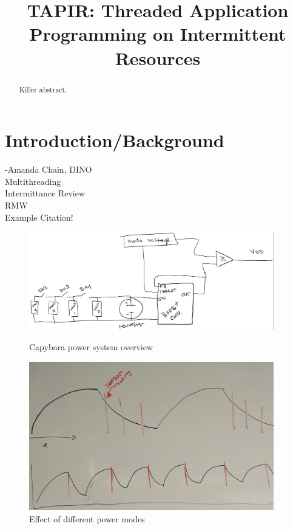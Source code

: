 \documentclass[11pt]{sensys-proc}
\title{TAPIR: Threaded Application Programming on Intermittent Resources}
\begin{document}
\maketitle

\begin{abstract}
Killer abstract.
\end{abstract}

\section{Introduction/Background} -Amanda
  \label{sec:intro}
  Chain, DINO\\
  Multithreading\\
  Intermittance Review\\
  RMW\\
  Example Citation\cite{Chain, Mementos, Aware, Dino}!


\begin{figure}
\centering
\begin{minipage}[b]{0.49\textwidth}
  \includegraphics[width=0.95\textwidth,center]{capybara-all.png}
\caption{Capybara power system overview}\label{label-a}
\end{minipage}\hfill
\begin{minipage}[b]{0.49\textwidth}
  \includegraphics[width=0.95\textwidth,center]{power_modes.pdf}
\caption{Effect of different power modes}\label{label-b}
\end{minipage}
\end{figure}
\end{document}
